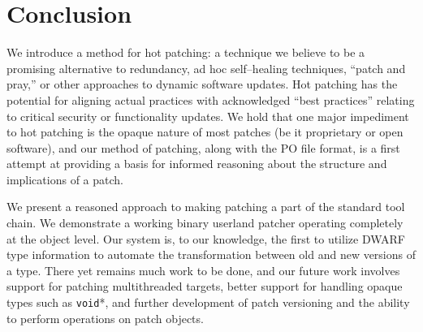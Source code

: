 \section{Conclusion}
\label{sec:conclusion}

We introduce a method for hot patching: a technique we believe to be a
promising alternative to redundancy, ad hoc self--healing techniques,
``patch and pray,'' or other approaches to dynamic software updates.
Hot patching has the potential for aligning actual practices with
acknowledged ``best practices'' relating to critical security or 
functionality updates.  We hold that one major impediment to hot
patching is the opaque nature of most patches (be it
proprietary or open software), and our method of patching, along with the
PO file format, is a first attempt at providing a basis for informed reasoning
about the structure and implications of a patch. 

We present a reasoned approach to making patching a part of the
standard tool chain. We demonstrate a working binary userland patcher
operating completely at the object level. Our system is, to our
knowledge, the first to utilize DWARF type information to automate the
transformation between old and new versions of a type. There yet
remains much work to be done, and our future work involves support for
patching multithreaded targets, better support for handling opaque
types such as \texttt{void}*, and further development of patch
versioning and the ability to perform operations on patch objects.
